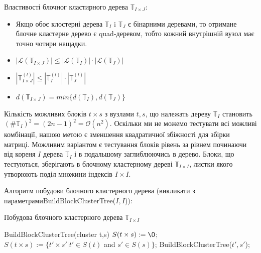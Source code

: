 \documentclass[12pt]{report}
\begin{document}
	\par Властивості блочног кластирного дерева $\mathbb{T}_{I\times J}$:
	\begin{itemize}
		\item Якщо обоє клостерні дерева $\mathbb{T}_I$ i  $\mathbb{T}_J$ є бінарними деревами, то отримане блочне кластерне дерево є quad-деревом, тобто кожний внутрішній вузол має точно чотири нащадки.
		\item $|\mathcal{L}(\mathbb{T}_{I\times J})|\le |\mathcal{L}(\mathbb{T}_I)|\cdot |\mathcal{L}(\mathbb{T}_J)|$
		\item $|\mathbb{T}_{I\times J}^{(l)}|\le |\mathbb{T}_I^{(l)}|\cdot |\mathbb{T}_J^{(l)}|$
		\item $d(\mathbb{T}_{I\times J})=min\{d(\mathbb{T}_I),d(\mathbb{T}_J)\}$
	\end{itemize}
	
	\par Кількість можливих блоків $t\times s$ з вузлами $t,s$, що належать дереву $\mathbb{T}_I$ становить $(\#\mathbb{T}_I)^2=(2n-1)^2=\mathcal{O}(n^2)$. Оскільки ми не можемо тестувати всі можливі комбінації, нашою метою є зменшення квадратичної збіжності для збірки матриці. Можливим варіантом є тестування блоків рівень за рівнем починаючи від кореня $I$ дерева $\mathbb{T}_I$ і в подальшому заглиблюючись в дерево. Блоки, що тестуються, зберігають в блочному кластерному дереві $\mathbb{T}_{I\times I}$, листки якого утворюють поділ множини індексів $I\times I$. \par Алгоритм побудови блочного кластерного дерева (викликати з параметрами\newline BuildBlockClusterTree($I,I$)):
	\begin{algorithm}
	\caption{Побудова блочного кластерного дерева $\mathbb{T}_{I\times I}$}
	\begin{algorithmic}
	 BuildBlockClusterTree(cluster t,s)
	\STATE $S(t\times s):=\O$;
	\ELSE
	\STATE $S(t\times s):=\{t'\times s'|t'\in S(t)$ and $s'\in S(s)\}$;
	\STATE BuildBlockClusterTree($t',s'$);
	\ENDFOR
	\ENDIF
	\end{algorithmic}

	\end{algorithm}
\end{document}
